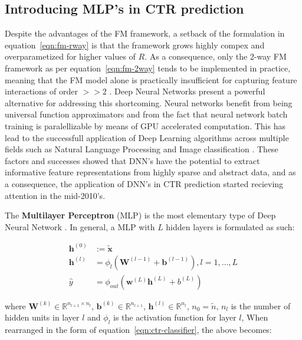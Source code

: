 \documentclass{mldsmsc}
\begin{document}
\subsection{Introducing MLP's in CTR prediction}

Despite the advantages of the FM framework, a setback of the formulation in equation~\ref{eqn:fm-rway}
is that the framework grows highly compex and overparametized for higher values of $R$.
As a consequence, only the 2-way FM framework as per equation~\ref{eqn:fm-2way} tends to be
implemented in practice, meaning that the FM model alone is practically insufficient for capturing
feature interactions of order $>>2$ \citep{RefWorks:guo2017deepfm:}. Deep Neural Networks
present a powerful alternative for addressing this shortcoming. Neural networks benefit from
being universal function approximators \citep{RefWorks:cybenko1989approximation} and from the
fact that neural network batch training is paralellizable by means of GPU accelerated computation.
This has lead to the successfull application of Deep Learning algorithms across multiple fields
such as Natural Language Processing and Image classification 
\citep{RefWorks:he2016deep,RefWorks:krizhevsky2017imagenet,RefWorks:lecun1998gradient-based}. 
These factors and successes showed that DNN's have the potential to extract informative
feature representations from highly sparse and abstract data, and as a consequence,
the application of DNN's in CTR prediction started recieving attention in the mid-2010's.

The \textbf{Multilayer Perceptron} (MLP) \label{ref:mlp} is the most elementary type of Deep Neural Network
\citep{RefWorks:webster2024week}. In general, a MLP with $L$ hidden layers is formulated as such:

\begin{align}
\label{eqn:mlp}
\mathbf{h}^{(0)} &:= \tilde{\mathbf{x}} \\
\mathbf{h}^{(l)} &= \phi_{l} \left( \mathbf{W}^{(l-1)} + \mathbf{b}^{(l-1)} \right), l = 1, \ldots, L \\
\hat{y} &= \phi_{out} \left( \mathbf{w}^{(L)} \mathbf{h}^{(L)} + b^{(L)} \right)
\end{align}

where $\mathbf{W}^{(k)} \in \mathbb{R}^{n_{l+1} \times n_l } $, $\mathbf{b}^{(k)} \in \mathbb{R}^{n_{l+1}}$,
$\mathbf{h}^{(l)} \in \mathbb{R}^{n_l}$, $n_0 = \tilde{n}$, $n_l$ is the number of hidden
units in layer $l$ and $\phi_{l}$ is the activation function for layer $l$, 
When rearranged in the form of equation~\ref{eqn:ctr-classifier}, the above becomes:
\end{document}
